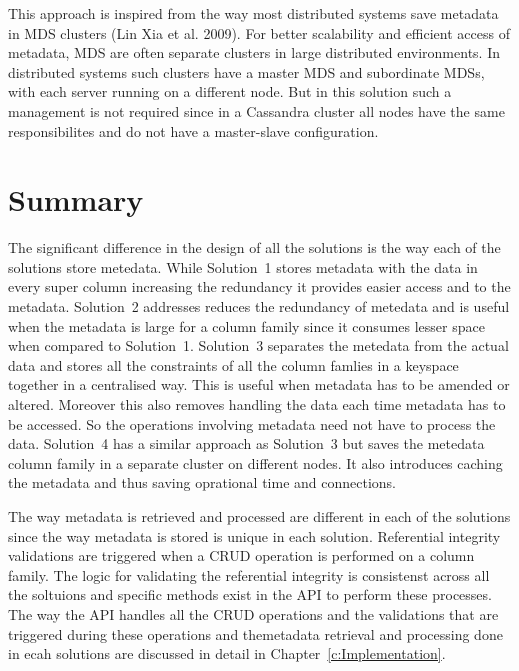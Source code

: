  This approach is inspired from the way most distributed systems
 save metadata in \ac{MDS} clusters (Lin Xia et al. 2009).
 For better scalability and efficient access of metadata, \ac{MDS} are
 often separate clusters in large distributed environments. In distributed
 systems such clusters  have a master \ac{MDS} and subordinate \acp{MDS}, with
 each server running on a different node. But in this solution such a management
 is not required since in a Cassandra cluster all nodes have the same
 responsibilites and do not have a master-slave configuration.
 
\section{Summary}
The significant difference in the design of all the  solutions is the way each
of the solutions store metedata. While Solution~1 stores metadata with the data
in every super column increasing the redundancy it provides easier access and to the metadata.
Solution~2 addresses reduces the redundancy of metedata and is useful when the
metadata is large for a column family since it consumes lesser space when
compared to Solution~1. Solution~3 separates the metedata from the actual data
and stores all the constraints of all the column famlies in a keyspace together
in a centralised way. This is useful when metadata has to be amended or altered.
Moreover this also removes handling the data each time metadata has to be
accessed. So the operations involving metadata need not have to process the
data. Solution~4 has a similar approach as Solution~3 but saves the metedata
column family in a separate cluster on different nodes. It also introduces
caching the metadata and thus saving oprational time and connections.

The way metadata is retrieved and
processed are different in each of the solutions since the way metadata is
stored is unique in each  solution. Referential integrity validations are
triggered when a \ac{CRUD} operation is performed on a column family. The logic
for validating the referential integrity is consistenst across all the soltuions
and specific methods exist in the \ac{API} to perform these processes. The way
the \ac{API} handles all the \ac{CRUD} operations and the validations that are
triggered during these operations and themetadata retrieval and processing
done in ecah solutions are discussed in detail in
Chapter~\ref{c:Implementation}.



